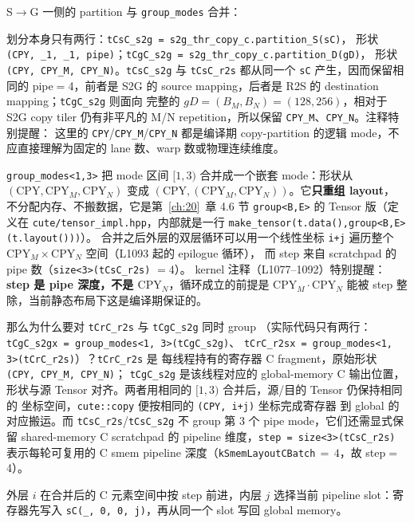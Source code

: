 S$\to$G 一侧的 partition 与 \texttt{group\_modes} 合并：

\begin{sloppypar}
划分本身只有两行：\texttt{tCsC\_s2g = s2g\_thr\_copy\_c.partition\_S(sC)}，
形状 \texttt{(CPY, \_1, \_1, pipe)}；\texttt{tCgC\_s2g = s2g\_thr\_copy\_c.partition\_D(gD)}，
形状 \texttt{(CPY, CPY\_M, CPY\_N)}。\texttt{tCsC\_s2g} 与 \texttt{tCsC\_r2s}
都从同一个 \texttt{sC} 产生，因而保留相同的 pipe$=$4，前者是 S2G 的
source mapping，后者是 R2S 的 destination mapping；\texttt{tCgC\_s2g} 则面向
完整的 $gD = (B_M, B_N) = (128, 256)$，相对于 S2G copy tiler 仍有非平凡的
M/N repetition，所以保留 \texttt{CPY\_M}、\texttt{CPY\_N}。注释特别提醒：
这里的 \texttt{CPY}/\texttt{CPY\_M}/\texttt{CPY\_N} 都是编译期 copy-partition
的逻辑 mode，不应直接理解为固定的 lane 数、warp 数或物理连续维度。
\end{sloppypar}

\begin{sloppypar}
\texttt{group\_\allowbreak{}modes\allowbreak{}<1,\allowbreak{}3>} 把 mode 区间 $[1,3)$ 合并成一个嵌套 mode：形状从
$(\mathrm{CPY}, \mathrm{CPY}_M, \mathrm{CPY}_N)$ 变成
$(\mathrm{CPY}, (\mathrm{CPY}_M, \mathrm{CPY}_N))$。它\textbf{只重组 layout}，
不分配内存、不搬数据，它是第~\ref{ch:20}~章 4.6 节 \texttt{group<B,E>}
的 Tensor 版（定义在 \texttt{cute/\allowbreak{}tensor\_\allowbreak{}impl.\allowbreak{}hpp}，内部就是一行
\texttt{make\_\allowbreak{}tensor\allowbreak{}(t.\allowbreak{}data\allowbreak{}(),\allowbreak{}}\allowbreak\texttt{group\allowbreak{}<B,\allowbreak{}E>\allowbreak{}(t.\allowbreak{}layout\allowbreak{}()))}）。
合并之后外层的双层循环可以用一个线性坐标 \texttt{i+j} 遍历整个
$\mathrm{CPY}_M\times\mathrm{CPY}_N$ 空间（L1093 起的 epilogue 循环），
而 step 来自 scratchpad 的 pipe 数（\texttt{size\allowbreak{}<3>\allowbreak{}(t\allowbreak{}Cs\allowbreak{}C\_\allowbreak{}r2s)} $=4$）。
kernel 注释（L1077--1092）特别提醒：\textbf{step 是 pipe 深度，不是
$\mathrm{CPY}_N$}，循环成立的前提是 $\mathrm{CPY}_M\cdot\mathrm{CPY}_N$ 能被
step 整除，当前静态布局下这是编译期保证的。
\end{sloppypar}

\begin{sloppypar}
那么为什么要对 \texttt{tCrC\_r2s} 与 \texttt{tCgC\_s2g} 同时 group
（实际代码只有两行：\texttt{tCgC\_s2gx = group\_modes<1, 3>(tCgC\_s2g)}、
\texttt{tCrC\_r2sx = group\_modes<1, 3>(tCrC\_r2s)}）？\texttt{tCrC\_r2s} 是
每线程持有的寄存器 C fragment，原始形状 \texttt{(CPY, CPY\_M, CPY\_N)}；
\texttt{tCgC\_s2g} 是该线程对应的 global-memory C 输出位置，形状与源
Tensor 对齐。两者用相同的 $[1,3)$ 合并后，源/目的 Tensor 仍保持相同的
坐标空间，\texttt{cute::copy} 便按相同的 \texttt{(CPY, i+j)} 坐标完成寄存器
到 global 的对应搬运。而 \texttt{tCsC\_r2s}/\texttt{tCsC\_s2g} 不 group
第 3 个 pipe mode，它们还需显式保留 shared-memory C scratchpad 的
pipeline 维度，\texttt{step = size<3>(tCsC\_r2s)} 表示每轮可复用的 C
smem pipeline 深度（\texttt{kSmemLayoutCBatch}$\,{=}\,4$，故 step$=$4）。

外层 $i$ 在合并后的 C 元素空间中按 step 前进，内层 $j$ 选择当前 pipeline
slot：寄存器先写入 \texttt{sC(\_, 0, 0, j)}，再从同一个 slot 写回 global memory。
\end{sloppypar}

